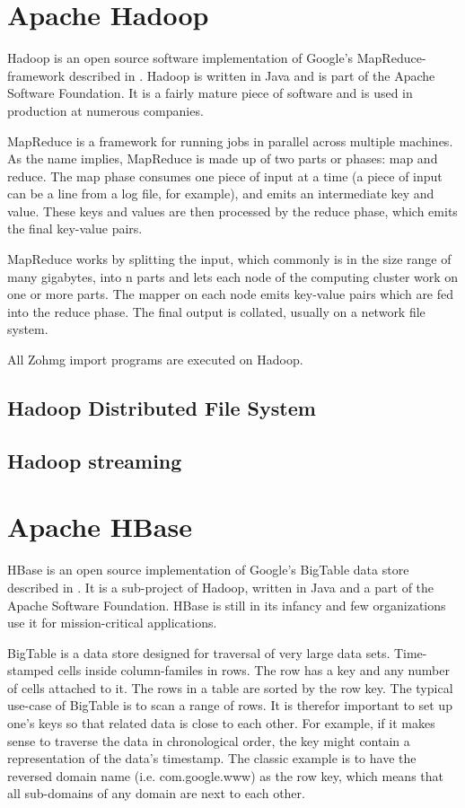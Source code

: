 \documentclass[a4paper,10pt]{book}
\begin{document}
\section{Apache Hadoop}

Hadoop is an open source software implementation of Google's MapReduce-framework described in \cite{mapreduce}. Hadoop is written in Java and is part of the Apache Software Foundation.  It is a fairly mature piece of software and is used in production at numerous companies.

MapReduce is a framework for running jobs in parallel across multiple machines.  As the name implies, MapReduce is made up of two parts or phases: map and reduce. The map phase consumes one piece of input at a time (a piece of input can be a line from a log file, for example), and emits an intermediate key and value. These keys and values are then processed by the reduce phase, which emits the final key-value pairs.

MapReduce works by splitting the input, which commonly is in the size range of many gigabytes, into n parts and lets each node of the computing cluster work on one or more parts. The mapper on each node emits key-value pairs which are fed into the reduce phase. The final output is collated, usually on a network file system.

All Zohmg import programs are executed on Hadoop.


\subsection{Hadoop Distributed File System}

\subsection{Hadoop streaming}

\section{Apache HBase}

HBase is an open source implementation of Google's BigTable data store described in \cite{bigtable}. It is a sub-project of Hadoop, written in Java and a part of the Apache Software Foundation. HBase is still in its infancy and few organizations use it for mission-critical applications.

BigTable is a data store designed for traversal of very large data sets.  Time-stamped cells inside column-familes in rows. The row has a key and any number of cells attached to it. The rows in a table are sorted by the row key.  The typical use-case of BigTable is to scan a range of rows. It is therefor important to set up one's keys so that related data is close to each other. For example, if it makes sense to traverse the data in chronological order, the key might contain a representation of the data's timestamp. The classic example is to have the reversed domain name (i.e.  com.google.www) as the row key, which means that all sub-domains of any domain are next to each other.
\end{document}
